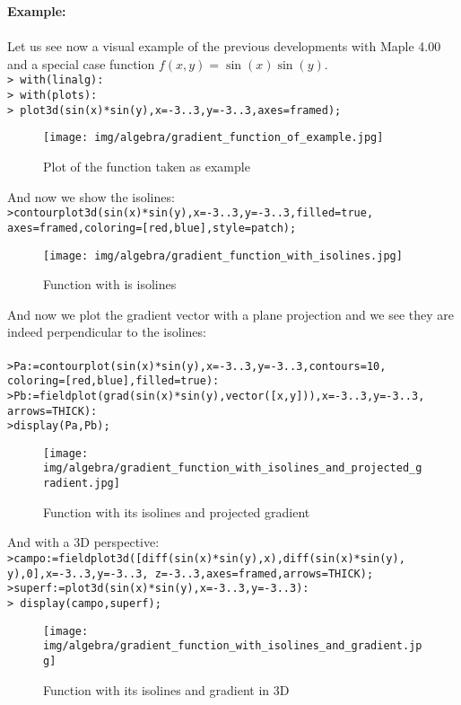 	\begin{tcolorbox}[colframe=black,colback=white,sharp corners]
	\textbf{{\Large {}}Example:}\\\\
	Let us see now a visual example of the previous developments with Maple 4.00 and a special case function $f(x,y)=\sin(x)\sin(y)$.\\
	
	\texttt{> with(linalg):\\
	> with(plots):\\
	> plot3d(sin(x)*sin(y),x=-3..3,y=-3..3,axes=framed);}\\
	\begin{figure}[H]
		\centering
		\texttt{[image: img/algebra/gradient\_function\_of\_example.jpg]}
		\caption[]{Plot of the function taken as example}
	\end{figure}
	And now we show the isolines:\\
	
	\texttt{>contourplot3d(sin(x)*sin(y),x=-3..3,y=-3..3,filled=true,\\
	axes=framed,coloring=[red,blue],style=patch);}
	\begin{figure}[H]
		\centering
		\texttt{[image: img/algebra/gradient\_function\_with\_isolines.jpg]}
		\caption[]{Function with is isolines}
	\end{figure}
	\end{tcolorbox}
	
	\pagebreak
	\begin{tcolorbox}[colframe=black,colback=white,sharp corners]

	And now we plot the gradient vector with a plane projection and we see they are indeed perpendicular to the isolines:\\\\
		\texttt{>Pa:=contourplot(sin(x)*sin(y),x=-3..3,y=-3..3,contours=10,\\
		coloring=[red,blue],filled=true):
\\
	>Pb:=fieldplot(grad(sin(x)*sin(y),vector([x,y])),x=-3..3,y=-3..3,\\
	arrows=THICK):\\
	>display(Pa,Pb);}
	\begin{figure}[H]
		\centering
		\texttt{[image: img/algebra/gradient\_function\_with\_isolines\_and\_projected\_gradient.jpg]}
		\caption[]{Function with its isolines and projected gradient}
	\end{figure}
	And with a 3D perspective:\\
	
	\texttt{>campo:=fieldplot3d([diff(sin(x)*sin(y),x),diff(sin(x)*sin(y),\\
	y),0],x=-3..3,y=-3..3,
z=-3..3,axes=framed,arrows=THICK);\\
>superf:=plot3d(sin(x)*sin(y),x=-3..3,y=-3..3):
\\
	> display({campo,superf});}
	\begin{figure}[H]
		\centering
		\texttt{[image: img/algebra/gradient\_function\_with\_isolines\_and\_gradient.jpg]}
		\caption[]{Function with its isolines and gradient in 3D}
	\end{figure}
	\end{tcolorbox}


